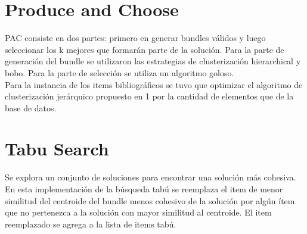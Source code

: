 \section{Produce and Choose}
PAC consiste en dos partes: primero en generar bundles válidos y luego seleccionar los k mejores que formarán parte de la solución. Para la parte de generación del bundle se utilizaron las estrategias de clusterización hierarchical y bobo. Para la parte de selección se utiliza un algoritmo goloso.\\
Para la instancia de los items bibliográficos se tuvo que optimizar el algoritmo de clusterización jerárquico propuesto en 1 por la cantidad de elementos que de la base de datos.\\
 
\section{Tabu Search}
Se explora un conjunto de soluciones para encontrar una solución más cohesiva. En esta implementación de la búsqueda tabú se reemplaza el item de menor similitud del centroide del bundle menos cohesivo de la solución por algún ítem que no pertenezca a la solución con mayor similitud al centroide. El item reemplazado se agrega a la lista de items tabú.